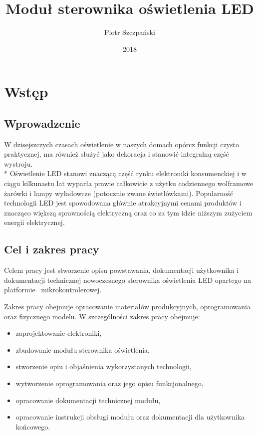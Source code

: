 \documentclass[12pt, eng, twoside, openany, final]{mgr}
\author{Piotr Szczpański}
\title{Moduł sterownika oświetlenia LED}
\date{2018}
\begin{document}
\maketitle
\tableofcontents
\listoffigures
\newpage

\pagestyle{fancy}
\fancyhead{} 
\fancyfoot{} 
\rfoot{\thepage}


\chapter{Wstęp}
\thispagestyle{fancy}
    \section{Wprowadzenie}
    W dzisejszczych czasach oświetlenie w naszych domach opórcz funkcji czysto praktycznej, ma również służyć jako dekoracja i stanowić integralną część wystroju. \\*
    Oświetlenie LED stanowi znaczącą część rynku elektroniki konsumenckiej i w ciągu kilkunastu lat wyparła prawie całkowicie z użytku codziennego wolframowe żarówki i lampy wyładowcze (potocznie zwane świetlówkami). Popularność technologii LED jest spowodowana głównie atrakcyjnymi cenami produktów i znacząco większą sprawnością elektryczną oraz co za tym idzie niższym zużyciem energii elektrycznej.
    
    \section{Cel i zakres pracy}
    Celem pracy jest stworzenie opisu powstawania, dokumentacji użytkownika i dokumentacji technicznej nowoczesnego sterownika oświetlenia LED opartego na platformie~ mikrokontrolerowej.
    
    Zakres pracy obejmuje opracowanie materiałów produkcyjnych, oprogramowania oraz fizycznego modelu. W szczególności zakres pracy obejmuje: 
    \begin{itemize}
        \item zaprojektowanie elektroniki, 
        \item zbudowanie modułu sterownika oświetlenia,
        \item stworzenie opiu i objaśnienia wykorzystanych technologii,
        \item wytworzenie oprogramowania oraz jego opisu funkcjonalnego,
        \item opracowanie dokumentacji technicznej modułu,
        \item opracowanie instrukcji obsługi modułu oraz dokumentacji dla użytkownika końcowego.
    \end{itemize}
%
\end{document}
